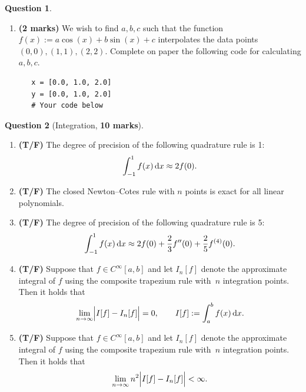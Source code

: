 \documentclass[10pt]{article}
\theoremstyle{definition}
\newtheorem{question}{Question}
\theoremstyle{remark}
\theoremstyle{plain}%
\begin{document}
\begin{question}
\begin{enumerate}
        \item
            \textbf{(2 marks)}
            We wish to find $a, b, c$ such that the function $f(x) := a \cos(x) + b \sin(x) + c$
            interpolates the data points $(0, 0), (1, 1), (2, 2)$.
            Complete on paper the following code for calculating $a, b, c$.
            \begin{verbatim}
   x = [0.0, 1.0, 2.0]
   y = [0.0, 1.0, 2.0]
   # Your code below
            \end{verbatim}
    \end{enumerate}
\end{question}

\newpage
\begin{question}
    [Integration, \textbf{10 marks}]
    $~$
    \begin{enumerate}
        \item
            \textbf{(T/F)}
            The degree of precision of the following quadrature rule is 1:
            \[
                \int_{-1}^{1} f(x) \, \mathrm d x
                \approx 2 f(0).
            \]

        \item
            \textbf{(T/F)}
            The closed Newton--Cotes rule with $n$ points is exact for all linear polynomials.

        \item
            \textbf{(T/F)}
            The degree of precision of the following quadrature rule is 5:
            \[
                \int_{-1}^1 f(x) \, \mathrm d x \approx 2f(0) + \frac{2}{3} f''(0) + \frac{2}{5} f^{(4)}(0).
            \]

        \item
            \textbf{(T/F)}
            Suppose that $f \in C^{\infty}[a, b]$ and let $I_n[f]$ denote the approximate integral of $f$ using the composite trapezium rule
            with~$n$ integration points.
            Then it holds that
            \[
                \lim_{n \to \infty} \Bigl\lvert I[f] - I_n[f] \Bigr\rvert = 0, \qquad I[f] := \int_{a}^{b} f(x) \, \mathrm d x.
            \]

        \item
            \textbf{(T/F)}
            Suppose that $f \in C^{\infty}[a, b]$ and let $I_n[f]$ denote the approximate integral of $f$ using the composite trapezium rule
            with~$n$ integration points.
            Then it holds that
            \[
                \lim_{n \to \infty} n^2 \Bigl\lvert I[f] - I_n[f] \Bigr\rvert < \infty.
            \]


\end{enumerate}
\end{question}
\end{document}

